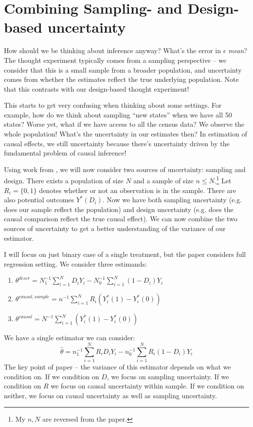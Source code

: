 \documentclass{tufte-handout}
\theoremstyle{break}
\begin{document}
\section{Combining Sampling- and Design-based uncertainty }

How should we be thinking about inference anyway? What's the error in $\epsilon$ \emph{mean}? The thought experiment typically comes from a sampling perspective -- we consider that this is a small sample from a broader population, and uncertainty comes from whether the estimates reflect the true underlying population. Note that this contrasts with our design-based thought experiment!

This starts to get very confusing when thinking about some settings. For example, how do we think about sampling ``new states'' when we have all 50 states? Worse yet, what if we have access to all the census data? We observe the whole population! What's the uncertainty in our estimates then? In estimation of causal effects, we still  uncertainty because there's uncertainty driven by the  fundamental problem of causal inference!

Using work from \citet{abadie2020sampling}, we will now consider two sources of uncertainty: sampling and design. There exists a population of size $N$ and a sample of size $n \leq N$.\footnote{My $n,N$ are reversed from the paper.} Let $R_{i} = \{0,1\}$ denotes whether or not an observation is in the sample.  There are also potential outcomes $Y^{*}(D_{i})$.  Now we have both sampling uncertainty (e.g. does our sample reflect the population) and design uncertainty (e.g. does the causal comparison reflect the true causal effect). We can now combine the two sources of uncertainty to get a better understanding of the variance of our estimator.

I will focus on just binary case of a single treatment, but the paper considers full regression setting. We consider three estimands:
\begin{enumerate}
  \item $\theta^{descr} = N^{-1}_{1}\sum_{i=1}^{N}D_{i}Y_{i} - N^{-1}_{0}\sum_{i=1}^{N}(1-D_{i})Y_{i}$
  \item $\theta^{causal, sample} = n^{-1}\sum_{i=1}^{N}R_{i}(Y^{*}_{i}(1) - Y_{i}^{*}(0))$
  \item $\theta^{causal} = N^{-1}\sum_{i=1}^{N}(Y^{*}_{i}(1) - Y_{i}^{*}(0))$    
\end{enumerate}
We have a single estimator we can consider:
\begin{equation*}
  \hat{\theta} = n^{-1}_{1}\sum_{i=1}^{N}R_{i}D_{i}Y_{i} - n^{-1}_{0}\sum_{i=1}^{N}R_{i}(1-D_{i})Y_{i}
\end{equation*}
The key point of paper -- the variance of this estimator depends on what we condition on. If we condition on  $D$, we focus on sampling uncertainty. If we condition on $R$ we focus on causal uncertainty within sample. If we condition on neither, we focus on causal uncertainty as well as sampling uncertainty.
      
\end{document}
